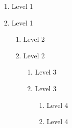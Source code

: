\documentclass[a4paper, article, lualatex]{jlreq}
\begin{document}
\begin{enumerate}
    \item Level 1
    \item Level 1
    \begin{enumerate}
        \item Level 2
        \item Level 2
        \begin{enumerate}
            \item Level 3
            \item Level 3
            \begin{enumerate}
                \item Level 4
                \item Level 4
            \end{enumerate}
        \end{enumerate}
    \end{enumerate}
\end{enumerate}
\end{document}
